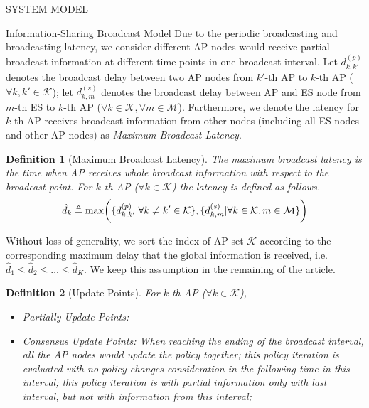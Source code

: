 \documentclass[10pt, conference, letterpaper]{IEEEtran}
\newtheorem{definition}{Definition}
\newcommand{\define}{\triangleq}
\DeclarePairedDelimiter{\set}{\{}{\}}
\DeclarePairedDelimiter{\Paren}{\bigg(}{\bigg)}
\newcommand{\apSet}{\mathcal{K}}
\newcommand{\esSet}{\mathcal{M}}
\begin{document}
\begin{section}{SYSTEM MODEL}
\begin{subsection}{Information-Sharing Broadcast Model}
            Due to the periodic broadcasting and broadcasting latency, we consider different AP nodes would receive partial broadcast information at different time points in one broadcast interval.
            Let $d^{(p)}_{k,k'}$ denotes the broadcast delay between two AP nodes from $k'$-th AP to $k$-th AP ($\forall k,k'\in\apSet$); let $d^{(s)}_{k,m}$ denotes the broadcast delay between AP and ES node from $m$-th ES to $k$-th AP ($\forall k\in\apSet,\forall m\in\esSet$).
            Furthermore, we denote the latency for $k$-th AP receives broadcast information from other nodes (including all ES nodes and other AP nodes) as \emph{Maximum Broadcast Latency}.
            \begin{definition}[Maximum Broadcast Latency]
                The maximum broadcast latency is the time when AP receives whole broadcast information with respect to the broadcast point. For $k$-th AP ($\forall k\in\apSet$) the latency is defined as follows.
                \begin{align}
                    \hat{d}_{k} \define \max\Paren{ \set{d^{(p)}_{k,k'}|\forall k \neq k' \in\apSet}, \set{d^{(s)}_{k,m}|\forall k\in\apSet,m\in\esSet} }
                \end{align}
            \end{definition}
            Without loss of generality, we sort the index of AP set $\apSet$ according to the corresponding maximum delay that the global information is received, i.e. $\hat{d}_{1} \leq \hat{d}_{2} \leq \dots \leq \hat{d}_{K}$. We keep this assumption in the remaining of the article.

            \begin{definition}[Update Points]
                For $k$-th AP ($\forall k\in\apSet$),
                \begin{itemize}
                    \item Partially Update Points: 
                    \item Consensus Update Points: When reaching the ending of the broadcast interval, all the AP nodes would update the policy together;
                    this policy iteration is evaluated with no policy changes consideration in the following time in this interval;
                    this policy iteration is with partial information only with last interval, but not with information from this interval;
                \end{itemize}
            \end{definition}


\end{subsection}
\end{section}
\end{document}
